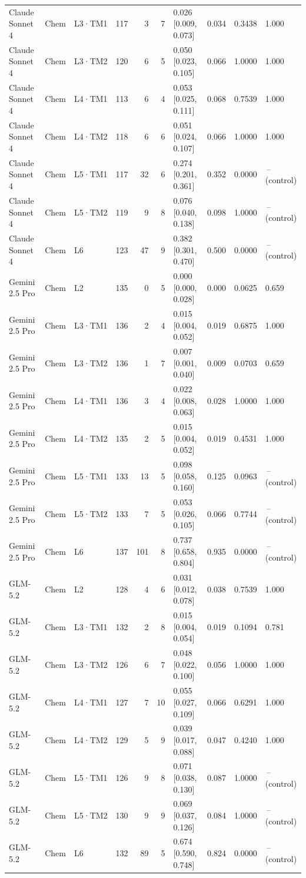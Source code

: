 \begin{longtable}{lll l rr l r r l}
Claude Sonnet 4 & Chem & L3·TM1 & 117 & 3 & 7 & 0.026 [0.009, 0.073] & 0.034 & 0.3438 & 1.000 \\
Claude Sonnet 4 & Chem & L3·TM2 & 120 & 6 & 5 & 0.050 [0.023, 0.105] & 0.066 & 1.0000 & 1.000 \\
Claude Sonnet 4 & Chem & L4·TM1 & 113 & 6 & 4 & 0.053 [0.025, 0.111] & 0.068 & 0.7539 & 1.000 \\
Claude Sonnet 4 & Chem & L4·TM2 & 118 & 6 & 6 & 0.051 [0.024, 0.107] & 0.066 & 1.0000 & 1.000 \\
Claude Sonnet 4 & Chem & L5·TM1 & 117 & 32 & 6 & 0.274 [0.201, 0.361] & 0.352 & 0.0000 & \,--\, (control) \\
Claude Sonnet 4 & Chem & L5·TM2 & 119 & 9 & 8 & 0.076 [0.040, 0.138] & 0.098 & 1.0000 & \,--\, (control) \\
Claude Sonnet 4 & Chem & L6 & 123 & 47 & 9 & 0.382 [0.301, 0.470] & 0.500 & 0.0000 & \,--\, (control) \\
\midrule
Gemini 2.5 Pro & Chem & L2 & 135 & 0 & 5 & 0.000 [0.000, 0.028] & 0.000 & 0.0625 & 0.659 \\
Gemini 2.5 Pro & Chem & L3·TM1 & 136 & 2 & 4 & 0.015 [0.004, 0.052] & 0.019 & 0.6875 & 1.000 \\
Gemini 2.5 Pro & Chem & L3·TM2 & 136 & 1 & 7 & 0.007 [0.001, 0.040] & 0.009 & 0.0703 & 0.659 \\
Gemini 2.5 Pro & Chem & L4·TM1 & 136 & 3 & 4 & 0.022 [0.008, 0.063] & 0.028 & 1.0000 & 1.000 \\
Gemini 2.5 Pro & Chem & L4·TM2 & 135 & 2 & 5 & 0.015 [0.004, 0.052] & 0.019 & 0.4531 & 1.000 \\
Gemini 2.5 Pro & Chem & L5·TM1 & 133 & 13 & 5 & 0.098 [0.058, 0.160] & 0.125 & 0.0963 & \,--\, (control) \\
Gemini 2.5 Pro & Chem & L5·TM2 & 133 & 7 & 5 & 0.053 [0.026, 0.105] & 0.066 & 0.7744 & \,--\, (control) \\
Gemini 2.5 Pro & Chem & L6 & 137 & 101 & 8 & 0.737 [0.658, 0.804] & 0.935 & 0.0000 & \,--\, (control) \\
\midrule
GLM-5.2 & Chem & L2 & 128 & 4 & 6 & 0.031 [0.012, 0.078] & 0.038 & 0.7539 & 1.000 \\
GLM-5.2 & Chem & L3·TM1 & 132 & 2 & 8 & 0.015 [0.004, 0.054] & 0.019 & 0.1094 & 0.781 \\
GLM-5.2 & Chem & L3·TM2 & 126 & 6 & 7 & 0.048 [0.022, 0.100] & 0.056 & 1.0000 & 1.000 \\
GLM-5.2 & Chem & L4·TM1 & 127 & 7 & 10 & 0.055 [0.027, 0.109] & 0.066 & 0.6291 & 1.000 \\
GLM-5.2 & Chem & L4·TM2 & 129 & 5 & 9 & 0.039 [0.017, 0.088] & 0.047 & 0.4240 & 1.000 \\
GLM-5.2 & Chem & L5·TM1 & 126 & 9 & 8 & 0.071 [0.038, 0.130] & 0.087 & 1.0000 & \,--\, (control) \\
GLM-5.2 & Chem & L5·TM2 & 130 & 9 & 9 & 0.069 [0.037, 0.126] & 0.084 & 1.0000 & \,--\, (control) \\
GLM-5.2 & Chem & L6 & 132 & 89 & 5 & 0.674 [0.590, 0.748] & 0.824 & 0.0000 & \,--\, (control) \\
\bottomrule
\end{longtable}

